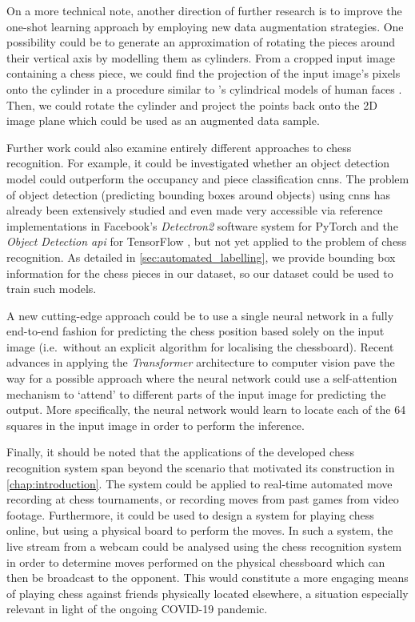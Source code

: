 \documentclass[../report.tex]{subfiles}
\begin{document}
On a more technical note, another direction of further research is to improve the one-shot learning approach by employing new data augmentation strategies.
One possibility could be to generate an approximation of rotating the pieces around their vertical axis by modelling them as cylinders.
From a cropped input image containing a chess piece, we could find the projection of the input image's pixels onto the cylinder in a procedure similar to \citeauthor{sung2008}'s cylindrical models of human faces \cite{sung2008}.
Then, we could rotate the cylinder and project the points back onto the 2D image plane which could be used as an augmented data sample.

Further work could also examine entirely different approaches to chess recognition. 
For example, it could be investigated whether an object detection model could outperform the occupancy and piece classification \glspl{cnn}.
The problem of object detection (predicting bounding boxes around objects) using \glspl{cnn} has already been extensively studied and even made very accessible via reference implementations in Facebook's \emph{Detectron2} software system for PyTorch \cite{wu2019detectron2}  and the \emph{Object Detection \acs{api}} for TensorFlow \cite{tfodapi2020}, but not yet applied to the problem of chess recognition.
As detailed in \cref{sec:automated_labelling}, we provide bounding box information for the chess pieces in our dataset, so our dataset could be used to train such models.

A new cutting-edge approach could be to use a single neural network in a fully end-to-end fashion for predicting the chess position based solely on the input image (i.e.\ without an explicit algorithm for localising the chessboard).
Recent advances in applying the \emph{Transformer} architecture \cite{vaswani2017} to computer vision \cite{wu2020,anonymous2020} pave the way for a possible approach where the neural network could use a self-attention mechanism to `attend' to different parts of the input image for predicting the output.
More specifically, the neural network would learn to locate each of the 64 squares in the input image in order to perform the inference.

Finally, it should be noted that the applications of the developed chess recognition system span beyond the scenario that motivated its construction in \cref{chap:introduction}.
The system could be applied to real-time automated move recording at chess tournaments, or recording moves from past games from video footage.
Furthermore, it could be used to design a system for playing chess online, but using a physical board to perform the moves.
In such a system, the live stream from a webcam could be analysed using the chess recognition system in order to determine moves performed on the physical chessboard which can then be broadcast to the opponent.
This would constitute a more engaging means of playing chess against friends physically located elsewhere, a situation especially relevant in light of the ongoing COVID-19 pandemic.

\ifSubfilesClassLoaded{%
\printglossary[type=\acronymtype]%
\printbibliography%
}{}%
\end{document}
